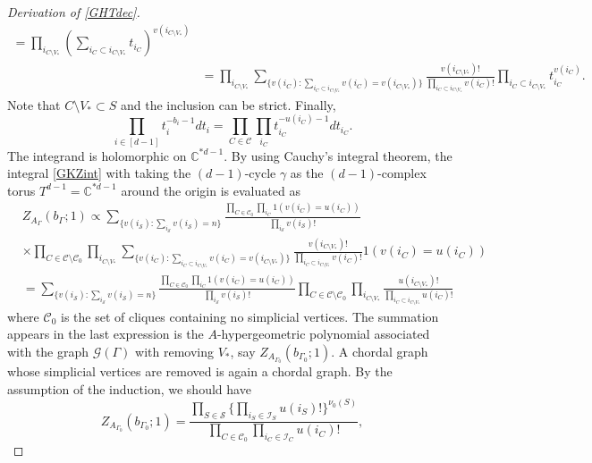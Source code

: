 \documentclass[a4paper,12pt]{article}
\theoremstyle{plain}
\theoremstyle{remark}
\begin{document}
\begin{proof}[Derivation of \eqref{GHTdec}]
\begin{align*}
    =\prod_{i_{C\setminus V_*}}
    \left(\sum_{i_C{\subset} i_{C\setminus V_*}}
    t_{i_C}\right)^{v(i_{C\setminus V_*})}\\
    &=\prod_{i_{C\setminus V_*}}
    \sum_{\{v(i_C):\sum_{i_C{\subset} i_{C\setminus V_*}}
    v(i_C)=v(i_{C\setminus V_*})\}}
    \frac{v(i_{C\setminus V_*})!}
    {\prod_{i_C{\subset} i_{C\setminus V_*}}v(i_C)!}
    \prod_{i_C{\subset} i_{C\setminus V_*}}t_{i_C}^{v(i_C)}.
  \end{align*}
  Note that $C\setminus V_*\subset S$ and the inclusion
  can be strict. Finally,
  \[
    \prod_{i\in[d-1]}t_i^{-b_i-1}dt_i=
    \prod_{C\in\mathcal{C}}\prod_{i_C}t_{i_C}^{-u(i_C)-1}
    dt_{i_C}.
  \]
  The integrand is holomorphic on $\mathbb{C}^{*d-1}$.
  By using Cauchy's integral theorem, the integral \eqref{GKZint}
  with taking the $(d-1)$-cycle $\gamma$ as the $(d-1)$-complex torus
  $T^{d-1}=\mathbb{C}^{*d-1}$
  around the origin is evaluated as
  \begin{align*}
    &Z_{A_\Gamma}(b_\Gamma;1)\propto
    \sum_{\{v(i_{\mathcal{S}}):\sum_{i_{\mathcal{S}}}v(i_{\mathcal{S}})=n\}}
    \frac{\prod_{C\in\mathcal{C}_0}\prod_{i_C}1(v(i_C)=u(i_C))}
         {\prod_{i_{\mathcal{S}}}v(i_{\mathcal{S}})!}\\
    &\times\prod_{C \in\mathcal{C}\setminus\mathcal{C}_0}
    \prod_{i_{C\setminus V_*}}
    \sum_{
      \{v(i_C):\sum_{i_C{\subset} i_{C\setminus V_*}}v(i_C)=v(i_{C\setminus V_*})\}}
    \frac{v(i_{C\setminus V_*})!}{\prod_{i_C{\subset} i_{C\setminus V_*}}v(i_C)!}1(v(i_C)=u(i_C))\\
    &=
    \sum_{\{v(i_{\mathcal{S}}):\sum_{i_{\mathcal{S}}} v(i_{\mathcal{S}})=n\}}
    \frac{\prod_{C\in\mathcal{C}_0}\prod_{i_C}1(v(i_C)=u(i_C))}{\prod_{i_{\mathcal{S}}}v(i_{\mathcal{S}})!}
    \prod_{C \in\mathcal{C}\setminus\mathcal{C}_0}
    \prod_{i_{C\setminus V_*}}\frac{u(i_{C\setminus V_*})!}
    {\prod_{i_C{\subset} i_{C\setminus V_*}}u(i_C)!}
  \end{align*}
  where $\mathcal{C}_0$ is the set of cliques containing no
  simplicial vertices. The summation appears in the last expression
  is the $A$-hypergeometric polynomial associated with the graph
  $\mathcal{G}(\Gamma)$ with removing $V_*$, say
  $Z_{A_{\Gamma_0}}(b_{\Gamma_0};1)$. A chordal graph whose
  simplicial vertices are removed is again a chordal graph. 
  By the assumption of the induction, we should have
  \[
    Z_{A_{\Gamma_0}}(b_{\Gamma_0};1)=
    \frac{\prod_{S\in\mathcal{S}}\{\prod_{i_S\in\mathcal{I}_S}
    u(i_S)!\}^{\nu_0(S)}}
    {\prod_{C\in\mathcal{C}_0}\prod_{i_C\in\mathcal{I}_C}u(i_C)!},
\]
\end{proof}
\end{document}
